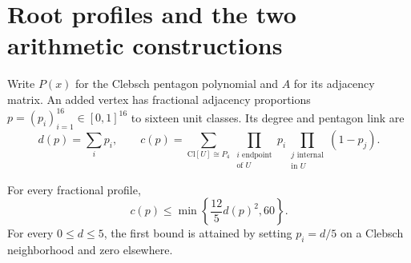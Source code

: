 \section{Root profiles and the two arithmetic constructions}
\label{sec:profiles}

Write $P(x)$ for the Clebsch pentagon polynomial and $A$ for its adjacency
matrix. An added vertex has fractional adjacency proportions
$p=(p_i)_{i=1}^{16}\in[0,1]^{16}$ to sixteen unit classes. Its degree and
pentagon link are
\[
 d(p)=\sum_i p_i,\qquad
 c(p)=\sum_{\mathrm{Cl}[U]\cong P_4}
       \prod_{\substack{i\text{ endpoint}\\\text{of }U}}p_i
       \prod_{\substack{j\text{ internal}\\\text{in }U}}(1-p_j).
\]

\begin{lemma}\label{lem:profile-envelope}
For every fractional profile,
\[
 c(p)\leq\min\left\{\frac{12}{5}d(p)^2,60\right\}.
\]
For every $0\leq d\leq5$, the first bound is attained by setting
$p_i=d/5$ on a Clebsch neighborhood and zero elsewhere.
\end{lemma}
